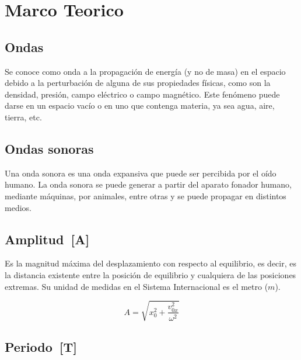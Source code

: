 \documentclass[letterpaper, 12pt]{article}
\begin{document}
\section*{Marco Teorico}

\subsection*{Ondas~\cite{onda_definicion}}

Se conoce como onda a la propagación de energía (y no de
masa) en el espacio debido a la perturbación de alguna de
sus propiedades físicas, como son la densidad, presión,
campo eléctrico o campo magnético. Este fenómeno puede
darse en un espacio vacío o en uno que contenga materia, ya
sea agua, aire, tierra, etc.

\subsection*{Ondas sonoras~\cite{ondas_sonoras}}

Una onda sonora es una onda expansiva que puede ser
percibida por el oído humano. La onda sonora se puede
generar a partir del aparato fonador humano, mediante
máquinas, por animales, entre otras y se puede propagar en
distintos medios.

\subsection*{Amplitud~[A]}

Es la magnitud máxima del desplazamiento con respecto al
equilibrio, es decir, es la distancia existente entre la
posición de equilibrio y cualquiera de las posiciones
extremas. Su unidad de medidas en el Sistema Internacional
es el metro ($m$).

\begin{equation}
	A = \sqrt{x_{0}^{2} + \frac{v_{0x}^{2}}{\omega^{2}}}
\end{equation}

\subsection*{Periodo~[T]}
\end{document}
